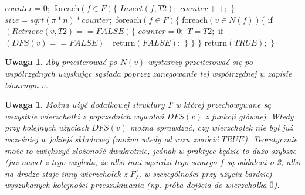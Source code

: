 \documentclass{pracamgr}
\newtheorem{remark}[theorem]{Uwaga}
\begin{document}
    \hspace*{16pt}	$counter=0;$\newline
    \hspace*{16pt}	foreach$(f\in F)\{$\newline
    \hspace*{32pt}		$Insert(f,T2);$\newline
    \hspace*{32pt}		$counter++;$\newline
    \hspace*{16pt}	$\}$\newline
    \hspace*{16pt}	$size=sqrt(\pi*n)*counter;$\newline
    \hspace*{16pt}	foreach$(f\in F)\{$\newline
    \hspace*{32pt}		foreach$(v\in N(f))\{$\newline
    \hspace*{48pt}			if$(Retrieve(v,T2)==FALSE)\{$\newline
    \hspace*{64pt}				$counter=0;$\newline
    \hspace*{64pt}				$T=T2;$\newline
    \hspace*{64pt}				if$(DFS(v)==FALSE)\quad $return$(FALSE);$\newline
    \hspace*{48pt}			$\}$\newline
    \hspace*{32pt}		$\}$\newline
    \hspace*{16pt}	$\}$\newline
    \hspace*{16pt}	return$(TRUE);$\newline
    \hspace*{0pt}$\}$\newline
    \begin{remark}\label{przeszukiwanie N(v)}
     Aby przeiterować po $N(v)$ wystarczy przeiterować się po współrzędnych uzyskując sąsiada poprzez zanegowanie tej współrzędnej w zapisie binarnym $v$.
    \end{remark}
    \begin{remark}\label{dwie struktury T}
     Można użyć dodatkowej struktury $T$ w której przechowywane są wszystkie wierzchołki z poprzednich wywołań $DFS(v)$ z funkcji głównej.
     Wtedy przy kolejnych użyciach $DFS(v)$ można sprawdzać, czy wierzchołek nie był już wcześniej w jakiejś składowej (można wtedy od razu zwrócić $TRUE$).
     Teoretycznie może to zwiększyć złożoność dwukrotnie, jednak w praktyce będzie to dużo szybsze
     (już nawet z tego wzgledu, że albo inni sąsiedzi tego samego $f$ są oddaleni o 2, albo na drodze staje inny wierzchołek z $F$),
     w szczególności przy użyciu bardziej wyszukanych kolejności przeszukiwania (np. próba dojścia do wierzchołka $\overline{0}$).
    \end{remark}
     
\end{document}

